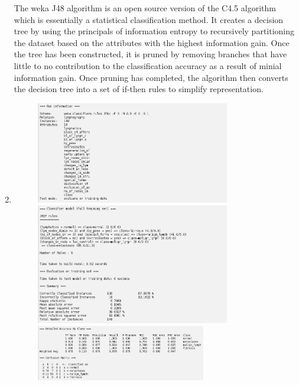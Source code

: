 \documentclass{article}
\begin{document}
\begin{enumerate}[label = (\alph*), left=10pt, itemsep=10pt]
\begin{minipage}[t]{0.9\textwidth}
\begin{figure}[H]
            \end{figure}
            The weka J48 algorithm is an open source version of the C4.5 algorithm which is essentially a statistical
            classification method. It creates a decision tree by using the principals of information entropy to recursively
            partitioning the dataset based on the attributes with the highest information gain. Once the tree has been
            constructed, it is pruned by removing branches that have little to no contribution to the classification
            accuracy as a result of minial information gain. Once pruning has completed, the algorithm then converts
            the decision tree into a set of if-then rules to simplify representation.
        \end{minipage}

        \item \begin{minipage}[t]{0.9\textwidth}
            \begin{figure}[H]
                \includegraphics[width=0.8\textwidth, height=0.25\textheight]{./6bii1.png}\\
                \includegraphics[width=0.8\textwidth, height=0.3\textheight]{./6bi1.png}\\
                \includegraphics[width=0.7\textwidth, height=0.15\textheight]{./6biii1.png}                

\end{figure}
\end{minipage}
\end{enumerate}
\end{document}

